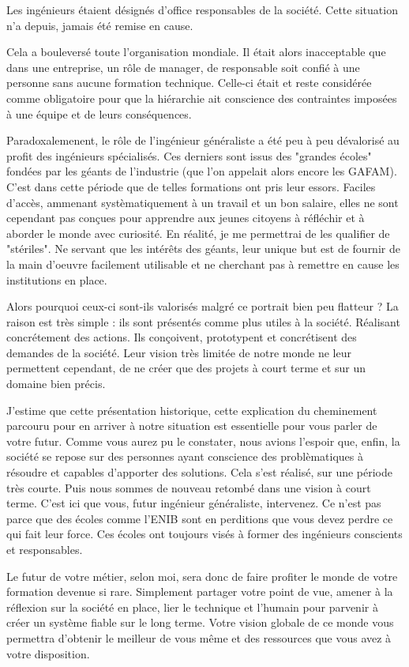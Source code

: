 {Les ingénieurs étaient désignés d'office responsables de la société. Cette situation n'a depuis, jamais été remise en cause.

Cela a bouleversé toute l'organisation mondiale. Il était alors inacceptable que dans une entreprise, un rôle de manager, de responsable soit confié à
une personne sans aucune formation technique. Celle-ci était et reste considérée comme obligatoire pour que la hiérarchie ait conscience des contraintes
imposées à une équipe et de leurs conséquences.

Paradoxalemenent, le rôle de l'ingénieur généraliste a été peu à peu dévalorisé au profit des ingénieurs spécialisés.
Ces derniers sont issus des "grandes écoles" fondées par les géants de l'industrie (que l'on appelait alors encore les GAFAM). C'est dans cette période
que de telles formations ont pris leur essors. Faciles d'accès, ammenant systèmatiquement à un travail et un bon salaire, elles ne sont cependant pas
conçues pour apprendre aux jeunes citoyens à réfléchir et à aborder le monde avec curiosité. En réalité, je me permettrai de les qualifier de "stériles".
Ne servant que les intérêts des géants, leur unique but est de fournir de la main d'oeuvre facilement utilisable et ne cherchant pas à remettre en cause
les institutions en place.

Alors pourquoi ceux-ci sont-ils valorisés malgré ce portrait bien peu flatteur ? La raison est très simple : ils sont présentés comme plus utiles à la
société. Réalisant concrétement des actions. Ils conçoivent, prototypent et concrétisent des demandes de la société.
Leur vision très limitée de notre monde ne leur permettent cependant, de ne créer que des projets à court terme et sur un domaine bien précis.

J'estime que cette présentation historique, cette explication du cheminement parcouru pour en arriver à notre situation est essentielle pour vous parler
de votre futur.
Comme vous aurez pu le constater, nous avions l'espoir que, enfin, la société se repose sur des personnes ayant conscience des problèmatiques à résoudre
et capables d'apporter des solutions.
Cela s'est réalisé, sur une période très courte. Puis nous sommes de nouveau retombé dans une vision à court terme.
C'est ici que vous, futur ingénieur généraliste, intervenez. Ce n'est pas parce que des écoles comme l'ENIB sont en perditions que vous devez perdre
ce qui fait leur force.
Ces écoles ont toujours visés à former des ingénieurs conscients et responsables.

Le futur de votre métier, selon moi, sera donc de faire profiter le monde de votre formation devenue si rare. Simplement partager votre point de vue,
amener à la réflexion sur la société en place, lier le technique et l'humain pour parvenir à créer un système fiable sur le long terme.
Votre vision globale de ce monde vous permettra d'obtenir le meilleur de vous même et des ressources que vous avez à votre disposition.

}
